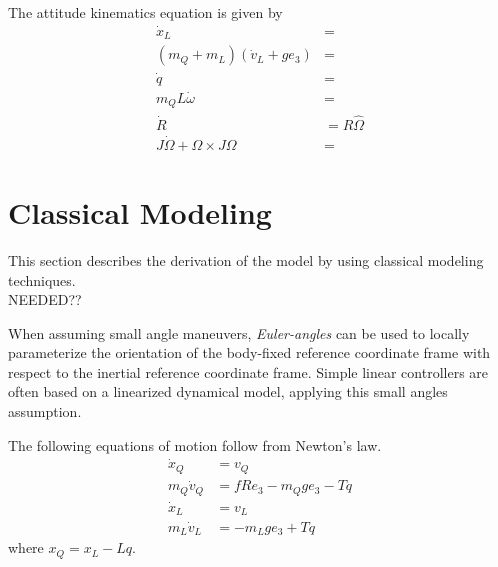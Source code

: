 The  attitude kinematics equation is given by
\begin{equation}\label{key}
\begin{aligned}
\dot{x}_L&=\\
(m_Q+m_L)(\dot{v}_L+ge_3)&=\\
\dot{q}&=\\
m_QL\dot{\omega}&=\\
\dot{R}&=R\hat{\Omega}\\
J\dot{\Omega}+\Omega\times J\Omega&=
\end{aligned}
\end{equation}


\section{Classical Modeling}\label{sec:mod.clas}

This section describes the derivation of the model by using classical modeling techniques.\\
NEEDED??



When assuming small angle maneuvers, \textit{Euler-angles} can be used to locally parameterize the orientation of the body-fixed reference coordinate frame with respect to the inertial reference coordinate frame. Simple linear controllers are often based on a linearized dynamical model, applying this small angles assumption. 

The following equations of motion follow from Newton's law.
\begin{equation}\label{eq:newton}
\begin{aligned}
\dot{x}_Q &= v_Q\\
m_Q\dot{v}_Q &=fRe_3-m_Qge_3-Tq\\
\dot{x}_L &= v_L\\
m_L\dot{v}_L &=-m_Lge_3+Tq
\end{aligned}
\end{equation}
where $ x_Q = x_L-Lq $.

